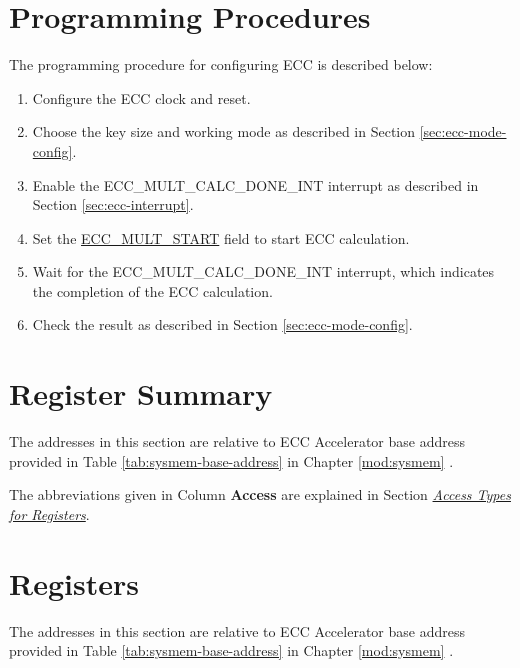 \documentclass[main\_\_EN.tex]{subfiles}
\begin{document}
\section{Programming Procedures}

The programming procedure for configuring ECC is described below:

\begin{enumerate}
    \item Configure the ECC clock and reset.
    \item Choose the key size and working mode as described in Section \ref{sec:ecc-mode-config}. 
    \item Enable the ECC\_MULT\_CALC\_DONE\_INT interrupt as described in Section \ref{sec:ecc-interrupt}.
    \item Set the \hyperref[fielddesc:ECCMULTSTART]{ECC\_MULT\_START} field to start ECC calculation.
    \item Wait for the ECC\_MULT\_CALC\_DONE\_INT interrupt, which indicates the completion of the ECC calculation.
    \item Check the result as described in Section \ref{sec:ecc-mode-config}.
\end{enumerate}





\clearpage
\hypertarget{ecc-reg-summ}{}
\section{Register Summary}
\label{sec:ecc-reg-summ}

The addresses in this section are relative to ECC Accelerator base address provided in Table \ref{tab:sysmem-base-address} in Chapter \ref{mod:sysmem} \textit{}.

The abbreviations given in Column \textbf{Access} are explained in Section \hyperref[glossary-access-types]{\textit{Access Types for Registers}}.






\clearpage
\section{Registers}

The addresses in this section are relative to ECC Accelerator base address provided in Table \ref{tab:sysmem-base-address} in Chapter \ref{mod:sysmem} \textit{}.


\end{document}
